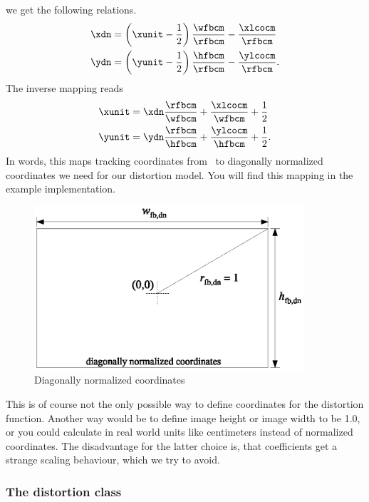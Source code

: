 \documentclass[10pt,a4paper]{article}
\begin{document}
we get the following relations.
\begin{align}
\label{eq:DefinitionUnitToDn}
\xdn &= \left(\xunit - \frac 1 2\right) \frac \wfbcm \rfbcm - \frac \xlcocm \rfbcm \nonumber\\
\ydn &= \left(\yunit - \frac 1 2\right) \frac \hfbcm \rfbcm - \frac \ylcocm \rfbcm.
\end{align}
The inverse mapping reads
\begin{align}
\label{eq:DefinitionDnToUnit}
\xunit &= \xdn \frac \rfbcm \wfbcm +\frac \xlcocm \wfbcm + \frac 1 2 \nonumber\\
\yunit &= \ydn \frac \rfbcm \hfbcm +\frac \ylcocm \hfbcm + \frac 1 2.
\end{align}
In words, this maps tracking coordinates from \tde\ to diagonally normalized coordinates we need for our distortion model.
You will find this mapping in the example implementation.
\begin{figure}[ht]
\centering
\includegraphics[width=10cm]{coordinates_lco_dn}
\caption{Diagonally normalized coordinates}
\label{fig:CoordinatesDiagNorm}
\end{figure}
This is of course not the only possible way to define coordinates for the distortion function.
Another way would be to define image height or image width to be 1.0, or you could calculate
in real world units like centimeters instead of normalized coordinates. The disadvantage for the
latter choice is, that coefficients get a strange scaling behaviour, which we try to avoid.

\subsubsection{The distortion class}
\end{document}

